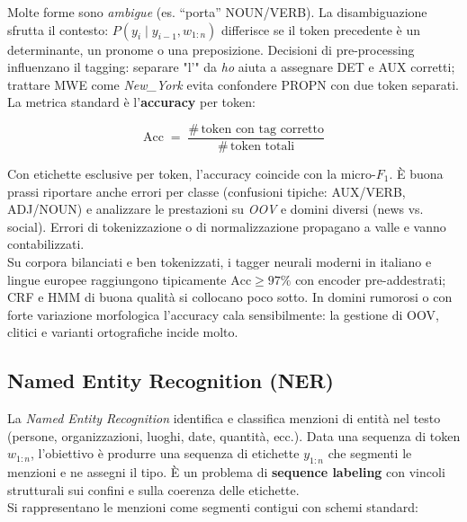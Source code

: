         Molte forme sono \emph{ambigue} (es. ``porta'' NOUN/VERB). La disambiguazione sfrutta il contesto: $P(y_i\mid y_{i-1},w_{1:n})$ differisce se il token precedente è un determinante, un pronome o una preposizione. Decisioni di pre-processing influenzano il tagging: separare "l'" da \emph{ho} aiuta a assegnare \textsc{DET} e \textsc{AUX} corretti; trattare MWE come \emph{New\_York} evita confondere \textsc{PROPN} con due token separati.\\
        
        La metrica standard è l'\textbf{accuracy} per token:
        
        $$
        \mathrm{Acc} \;=\; \frac{\#\,\text{token con tag corretto}}{\#\,\text{token totali}}
        $$
        
        Con etichette esclusive per token, l'accuracy coincide con la micro-$F_1$. È buona prassi riportare anche errori per classe (confusioni tipiche: \textsc{AUX}/\textsc{VERB}, \textsc{ADJ}/\textsc{NOUN}) e analizzare le prestazioni su \emph{OOV} e domini diversi (news vs. social). Errori di tokenizzazione o di normalizzazione propagano a valle e vanno contabilizzati.\\

        Su corpora bilanciati e ben tokenizzati, i tagger neurali moderni in italiano e lingue europee raggiungono tipicamente $\mathrm{Acc} \ge 97\%$ con encoder pre-addestrati; CRF e HMM di buona qualità si collocano poco sotto. In domini rumorosi o con forte variazione morfologica l'accuracy cala sensibilmente: la gestione di OOV, clitici e varianti ortografiche incide molto.

    \newpage

    \subsection{Named Entity Recognition (NER)}
    
        La \emph{Named Entity Recognition} identifica e classifica menzioni di entità nel testo (persone, organizzazioni, luoghi, date, quantità, ecc.). Data una sequenza di token $w_{1:n}$, l’obiettivo è produrre una sequenza di etichette $y_{1:n}$ che segmenti le menzioni e ne assegni il tipo. È un problema di \textbf{sequence labeling} con vincoli strutturali sui confini e sulla coerenza delle etichette.\\
        
        Si rappresentano le menzioni come segmenti contigui con schemi standard:
        
